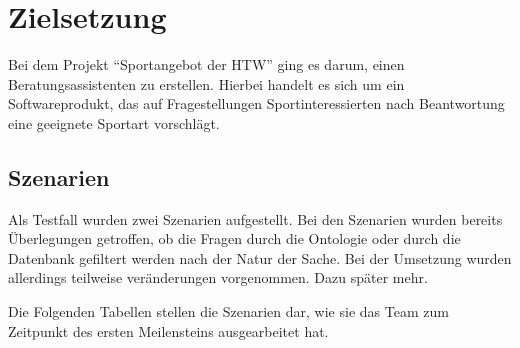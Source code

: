 \chapter{Zielsetzung}

Bei dem Projekt "`Sportangebot der HTW"' ging es darum, einen Beratungsassistenten zu erstellen. Hierbei handelt es sich um ein Softwareprodukt, das auf Fragestellungen Sportinteressierten nach Beantwortung eine geeignete Sportart vorschlägt.

\section{Szenarien}

Als Testfall wurden zwei Szenarien aufgestellt. Bei den Szenarien wurden bereits Überlegungen getroffen, ob die Fragen durch die Ontologie oder durch die Datenbank gefiltert werden nach der Natur der Sache. Bei der Umsetzung wurden allerdings teilweise veränderungen vorgenommen. Dazu später mehr.

Die Folgenden Tabellen stellen die Szenarien dar, wie sie das Team zum Zeitpunkt des ersten Meilensteins ausgearbeitet hat.


